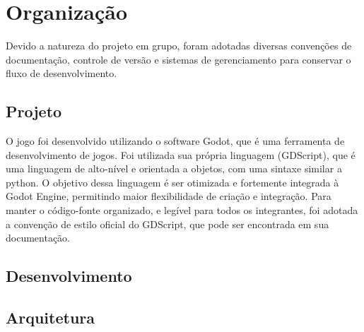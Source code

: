 
\chapter{Organização}
\label{cap:organizacao}

Devido a natureza do projeto em grupo, foram adotadas diversas convenções
de documentação, controle de versão e sistemas de gerenciamento para
conservar o fluxo de desenvolvimento.

\section{Projeto}
\label{sec:projeto}

O jogo foi desenvolvido utilizando o software Godot, que é uma ferramenta
de desenvolvimento de jogos. Foi utilizada sua própria linguagem (GDScript),
que é uma linguagem de alto-nível e orientada a objetos, com uma sintaxe
similar a python. O objetivo dessa linguagem é ser otimizada e fortemente
integrada à Godot Engine, permitindo maior flexibilidade de criação e integração.
Para manter o código-fonte organizado, e legível para todos os integrantes, foi
adotada a convenção de estilo oficial do GDScript, que pode ser encontrada em sua
documentação.



\section{Desenvolvimento}
\label{sec:desenvolvimento}


\section{Arquitetura}
\label{sec:arquitetura}
